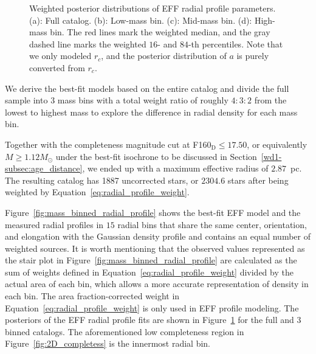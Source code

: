 \documentclass[12pt]{ucsddissertation}
\begin{document}
\begin{CJK*}{UTF8}{gbsn}
\begin{figure}[htb!]
    \centering
    \caption[Radial profile posteriors]{Weighted posterior distributions of EFF radial profile parameters. (a): Full catalog. (b): Low-mass bin. (c): Mid-mass bin. (d): High-mass bin. The red lines mark the weighted median, and the gray dashed line marks the weighted $16$- and $84$-th percentiles. Note that we only modeled $r_c$, and the posterior distribution of $a$ is purely converted from $r_c$.}
    \label{fig:radial_profile_posteriors}
\end{figure}


We derive the best-fit models based on the entire catalog and divide the full sample into $3$ mass bins with a total weight ratio of roughly $4:3:2$ from the lowest to highest mass to explore the difference in radial density for each mass bin. 

Together with the completeness magnitude cut at F160$_\mathrm{D} \leq 17.50$, or equivalently $M \geq 1.12 M_\odot$ under the best-fit isochrone to be discussed in Section~\ref{wd1-subsec:age_distance}, we ended up with a maximum effective radius of $2.87$~pc. The resulting catalog has \num{1887} uncorrected stars, or $2304.6$ stars after being weighted by Equation~\eqref{eq:radial_profile_weight}. 

Figure~\ref{fig:mass_binned_radial_profile} shows the best-fit EFF model and the measured radial profiles in $15$ radial bins that share the same center, orientation, and elongation with the Gaussian density profile and contains an equal number of weighted sources. It is worth mentioning that the observed values represented as the stair plot in Figure~\ref{fig:mass_binned_radial_profile} are calculated as the sum of weights defined in Equation~\eqref{eq:radial_profile_weight} divided by the actual area of each bin, which allows a more accurate representation of density in each bin. The area fraction-corrected weight in Equation~\eqref{eq:radial_profile_weight} is only used in EFF profile modeling. The posteriors of the EFF radial profile fits are shown in Figure~\ref{fig:radial_profile_posteriors} for the full and $3$ binned catalogs. The aforementioned low completeness region in Figure~\ref{fig:2D_completess} is the innermost radial bin. 



\end{CJK*}
\end{document}
